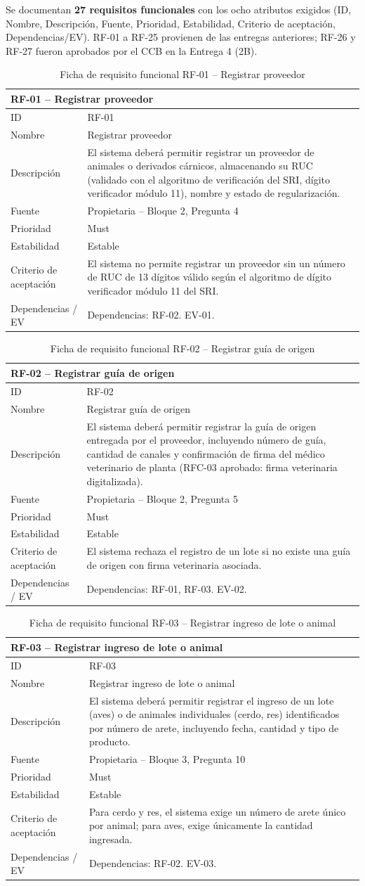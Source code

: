\documentclass[11pt,a4paper]{article}
\begin{document}
Se documentan \textbf{27 requisitos funcionales} con los ocho atributos exigidos (ID, Nombre, Descripción, Fuente, Prioridad, Estabilidad, Criterio de aceptación, Dependencias/EV). RF-01 a RF-25 provienen de las entregas anteriores; RF-26 y RF-27 fueron aprobados por el CCB en la Entrega 4 (2B).

\newcommand{\rfitem}[8]{%
\begin{longtable}{|p{2.4cm}|p{11.2cm}|}
\caption[RF-#1: #2]{Ficha de requisito funcional #1 -- #2}\\
\hline
\multicolumn{2}{|l|}{\textbf{#1 -- #2}} \\
\hline
ID & #1 \\
\hline
Nombre & #2 \\
\hline
Descripción & #3 \\
\hline
Fuente & #4 \\
\hline
Prioridad & #5 \\
\hline
Estabilidad & #6 \\
\hline
Criterio de aceptación & #7 \\
\hline
Dependencias / EV & #8 \\
\hline
\end{longtable}
\vspace{-0.4cm}
}

\rfitem{RF-01}{Registrar proveedor}{El sistema deberá permitir registrar un proveedor de animales o derivados cárnicos, almacenando su RUC (validado con el algoritmo de verificación del SRI, dígito verificador módulo 11), nombre y estado de regularización.}{Propietaria -- Bloque 2, Pregunta 4}{Must}{Estable}{El sistema no permite registrar un proveedor sin un número de RUC de 13 dígitos válido según el algoritmo de dígito verificador módulo 11 del SRI.}{Dependencias: RF-02. EV-01.}

\rfitem{RF-02}{Registrar guía de origen}{El sistema deberá permitir registrar la guía de origen entregada por el proveedor, incluyendo número de guía, cantidad de canales y confirmación de firma del médico veterinario de planta (RFC-03 aprobado: firma veterinaria digitalizada).}{Propietaria -- Bloque 2, Pregunta 5}{Must}{Estable}{El sistema rechaza el registro de un lote si no existe una guía de origen con firma veterinaria asociada.}{Dependencias: RF-01, RF-03. EV-02.}

\rfitem{RF-03}{Registrar ingreso de lote o animal}{El sistema deberá permitir registrar el ingreso de un lote (aves) o de animales individuales (cerdo, res) identificados por número de arete, incluyendo fecha, cantidad y tipo de producto.}{Propietaria -- Bloque 3, Pregunta 10}{Must}{Estable}{Para cerdo y res, el sistema exige un número de arete único por animal; para aves, exige únicamente la cantidad ingresada.}{Dependencias: RF-02. EV-03.}
\end{document}
